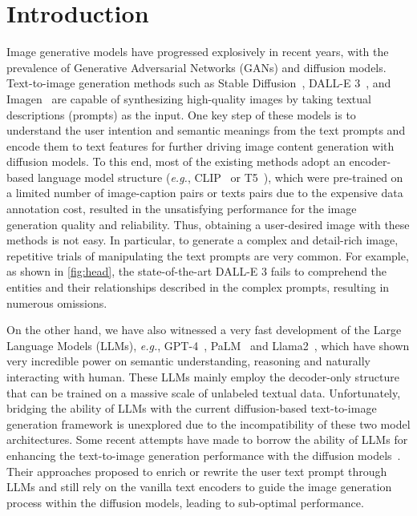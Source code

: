 \section{Introduction}
\label{sec:intro}



Image generative models have progressed explosively in recent years, with the prevalence of Generative Adversarial Networks (GANs) and diffusion models. Text-to-image generation methods such as Stable Diffusion~\cite{LDM,SDXL}, DALL-E 3~\cite{Dalle3}, and Imagen~\cite{ImgGen} are capable of synthesizing high-quality images by taking textual descriptions (prompts) as the input. One key step of these models is to understand the user intention and semantic meanings from the text prompts and encode them to text features for further driving image content generation with diffusion models. To this end, most of the existing methods adopt an encoder-based language model structure (\emph{e.g.}, CLIP~\cite{CLIP} or T5~\cite{T5}), which were pre-trained on a limited number of image-caption pairs or texts pairs due to the expensive data annotation cost, resulted in the unsatisfying performance for the image generation quality and reliability. Thus, obtaining a user-desired image with these methods is not easy. In particular, to generate a complex and detail-rich image, repetitive trials of manipulating the text prompts are very common. For example, as shown in \cref{fig:head}, the state-of-the-art DALL-E 3 fails to comprehend the entities and their relationships described in the complex prompts, resulting in numerous omissions.


On the other hand, we have also witnessed a very fast development of the Large Language Models (LLMs), \emph{e.g.}, GPT-4~\cite{GPT4}, PaLM~\cite{PaLM} and Llama2~\cite{Llama2}, which have shown very incredible power on semantic understanding, reasoning and naturally interacting with human. These LLMs mainly employ the decoder-only structure that can be trained on a massive scale of unlabeled textual data. Unfortunately, bridging the ability of LLMs with the current diffusion-based text-to-image generation framework is unexplored due to the incompatibility of these two model architectures. Some recent attempts have made to borrow the ability of LLMs for enhancing the text-to-image generation performance with the diffusion models~\cite{LLM_Grounded, LLM_Blueprint}. Their approaches proposed to enrich or rewrite the user text prompt through LLMs and still rely on the vanilla text encoders to guide the image generation process within the diffusion models, leading to sub-optimal performance. 

